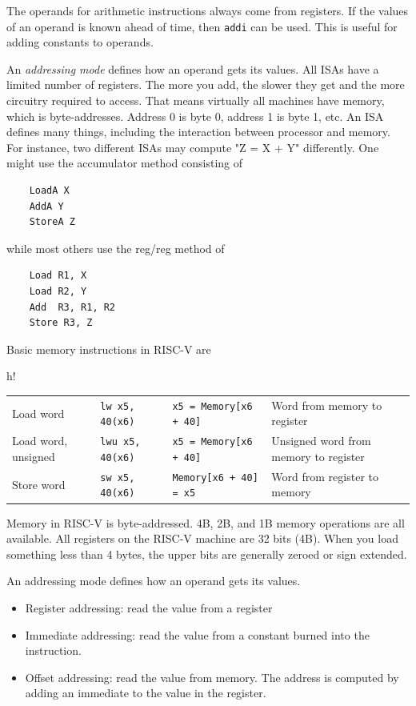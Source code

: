 The operands for arithmetic instructions
always come from registers. If the
values of an operand is known ahead
of time, then \texttt{addi} can be used.
This is useful for adding constants to
operands.

An \emph{addressing mode} defines how an operand gets its
values. All ISAs have a limited number of registers.
The more you add, the slower they get and the more
circuitry required to access. That means virtually all
machines have memory, which is byte-addresses. Address
0 is byte 0, address 1 is byte 1, etc. An ISA defines
many things, including the interaction between processor
and memory. For instance, two different ISAs
may compute "Z = X + Y" differently. One might
use the accumulator method consisting of
\begin{lstlisting}
    LoadA X
    AddA Y
    StoreA Z
\end{lstlisting}
while most others use the reg/reg method of
\begin{lstlisting}
    Load R1, X
    Load R2, Y
    Add  R3, R1, R2
    Store R3, Z
\end{lstlisting}

Basic memory instructions in RISC-V are
\begin{table}{h!}
    \begin{tabular}{llll}
        Load word           & \texttt{lw x5, 40(x6)}  & \texttt{x5 = Memory[x6 + 40]} & Word from memory to register          \\
        Load word, unsigned & \texttt{lwu x5, 40(x6)} & \texttt{x5 = Memory[x6 + 40]} & Unsigned word from memory to register \\
        Store word          & \texttt{sw x5, 40(x6)}  & \texttt{Memory[x6 + 40] = x5} & Word from register to memory
    \end{tabular}
\end{table}

Memory in RISC-V is byte-addressed.
4B, 2B, and 1B memory operations are
all available. All registers on the
RISC-V machine are 32 bits (4B).
When you load something less than 4 bytes,
the upper bits are generally zeroed or
sign extended.

An addressing mode defines how an operand gets its values.
\begin{itemize}
    \item Register addressing: read the value from a register
    \item Immediate addressing: read the value from a constant
          burned into the instruction.
    \item Offset addressing: read the value from memory.
          The address is computed by adding an immediate to the value
          in the register.
\end{itemize}

